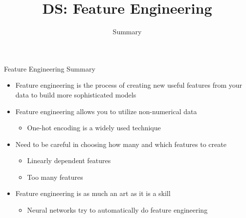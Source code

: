 \documentclass[aspectratio=169]{../latex_main/tntbeamer}  %
\title[Introduction]{DS: Feature Engineering}
\subtitle{Summary}
\begin{document}
	
	\maketitle
	\begin{frame}{Feature Engineering Summary}
	    \begin{itemize}
	        \item Feature engineering is the process of creating new useful features from your data to build more sophisticated models
	        \item Feature engineering allows you to utilize non-numerical data
	        \begin{itemize}
	            \item One-hot encoding is a widely used technique
	        \end{itemize} 
	        \item Need to be careful in choosing how many and which features to create
	        \begin{itemize}
	            \item Linearly dependent features
	            \item Too many features
	        \end{itemize}
	        \item Feature engineering is as much an art as it is a skill
	        \begin{itemize}
	            \item Neural networks try to automatically do feature engineering 
	        \end{itemize}
	    \end{itemize}
	\end{frame}
	
\end{document}

